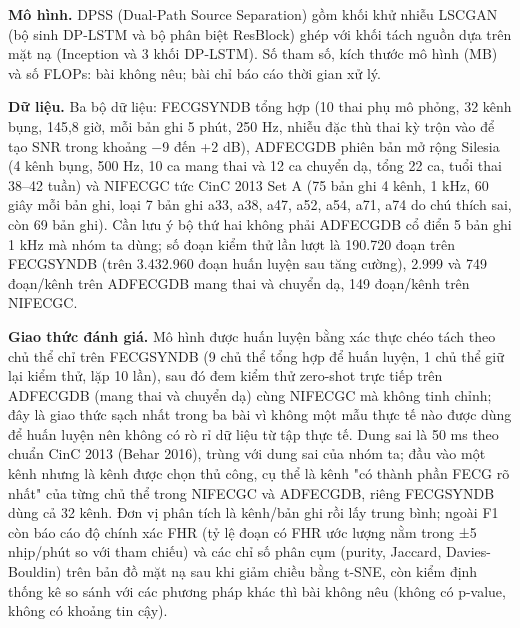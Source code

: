 \documentclass[12pt,a4paper]{article}
\begin{document}
\noindent \textbf{Mô hình.} DPSS (Dual-Path Source Separation) gồm khối khử nhiễu LSCGAN (bộ sinh DP-LSTM và bộ phân biệt ResBlock) ghép với khối tách nguồn dựa trên mặt nạ (Inception và 3 khối DP-LSTM). Số tham số, kích thước mô hình (MB) và số FLOPs: bài không nêu; bài chỉ báo cáo thời gian xử lý.\par\vspace{3pt}
\noindent \textbf{Dữ liệu.} Ba bộ dữ liệu: FECGSYNDB tổng hợp (10 thai phụ mô phỏng, 32 kênh bụng, 145,8 giờ, mỗi bản ghi 5 phút, 250 Hz, nhiễu đặc thù thai kỳ trộn vào để tạo SNR trong khoảng −9 đến +2 dB), ADFECGDB phiên bản mở rộng Silesia (4 kênh bụng, 500 Hz, 10 ca mang thai và 12 ca chuyển dạ, tổng 22 ca, tuổi thai 38–42 tuần) và NIFECGC tức CinC 2013 Set A (75 bản ghi 4 kênh, 1 kHz, 60 giây mỗi bản ghi, loại 7 bản ghi a33, a38, a47, a52, a54, a71, a74 do chú thích sai, còn 69 bản ghi). Cần lưu ý bộ thứ hai không phải ADFECGDB cổ điển 5 bản ghi 1 kHz mà nhóm ta dùng; số đoạn kiểm thử lần lượt là 190.720 đoạn trên FECGSYNDB (trên 3.432.960 đoạn huấn luyện sau tăng cường), 2.999 và 749 đoạn/kênh trên ADFECGDB mang thai và chuyển dạ, 149 đoạn/kênh trên NIFECGC.\par\vspace{3pt}
\noindent \textbf{Giao thức đánh giá.} Mô hình được huấn luyện bằng xác thực chéo tách theo chủ thể chỉ trên FECGSYNDB (9 chủ thể tổng hợp để huấn luyện, 1 chủ thể giữ lại kiểm thử, lặp 10 lần), sau đó đem kiểm thử zero-shot trực tiếp trên ADFECGDB (mang thai và chuyển dạ) cùng NIFECGC mà không tinh chỉnh; đây là giao thức sạch nhất trong ba bài vì không một mẫu thực tế nào được dùng để huấn luyện nên không có rò rỉ dữ liệu từ tập thực tế. Dung sai là 50 ms theo chuẩn CinC 2013 (Behar 2016), trùng với dung sai của nhóm ta; đầu vào một kênh nhưng là kênh được chọn thủ công, cụ thể là kênh "có thành phần FECG rõ nhất" của từng chủ thể trong NIFECGC và ADFECGDB, riêng FECGSYNDB dùng cả 32 kênh. Đơn vị phân tích là kênh/bản ghi rồi lấy trung bình; ngoài F1 còn báo cáo độ chính xác FHR (tỷ lệ đoạn có FHR ước lượng nằm trong ±5 nhịp/phút so với tham chiếu) và các chỉ số phân cụm (purity, Jaccard, Davies-Bouldin) trên bản đồ mặt nạ sau khi giảm chiều bằng t-SNE, còn kiểm định thống kê so sánh với các phương pháp khác thì bài không nêu (không có p-value, không có khoảng tin cậy).\par\vspace{3pt}
\end{document}
